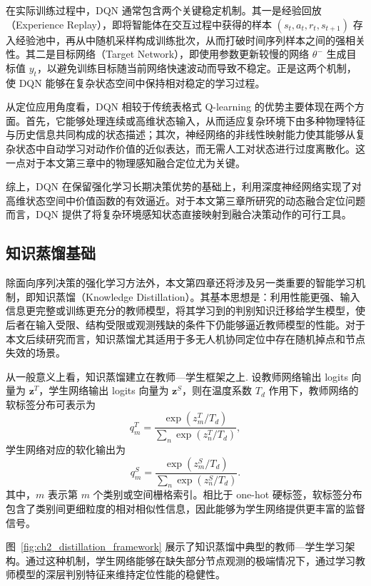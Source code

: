 在实际训练过程中，DQN 通常包含两个关键稳定机制。其一是经验回放（Experience Replay），即将智能体在交互过程中获得的样本 $(s_t,a_t,r_t,s_{t+1})$ 存入经验池中，再从中随机采样构成训练批次，从而打破时间序列样本之间的强相关性。其二是目标网络（Target Network），即使用参数更新较慢的网络 $\theta^-$ 生成目标值 $y_t$，以避免训练目标随当前网络快速波动而导致不稳定。正是这两个机制，使 DQN 能够在复杂状态空间中保持相对稳定的学习过程。

从定位应用角度看，DQN 相较于传统表格式 Q-learning 的优势主要体现在两个方面。首先，它能够处理连续或高维状态输入，从而适应复杂环境下由多种物理特征与历史信息共同构成的状态描述；其次，神经网络的非线性映射能力使其能够从复杂状态中自动学习对动作价值的近似表达，而无需人工对状态进行过度离散化。这一点对于本文第三章中的物理感知融合定位尤为关键。

综上，DQN 在保留强化学习长期决策优势的基础上，利用深度神经网络实现了对高维状态空间中价值函数的有效逼近。对于本文第三章所研究的动态融合定位问题而言，DQN 提供了将复杂环境感知状态直接映射到融合决策动作的可行工具。

\subsection{知识蒸馏基础}
\label{subsec:2_4_3}

除面向序列决策的强化学习方法外，本文第四章还将涉及另一类重要的智能学习机制，即知识蒸馏（Knowledge Distillation）。其基本思想是：利用性能更强、输入信息更完整或训练更充分的教师模型，将其学习到的判别知识迁移给学生模型，使后者在输入受限、结构受限或观测残缺的条件下仍能够逼近教师模型的性能。对于本文后续研究而言，知识蒸馏尤其适用于多无人机协同定位中存在随机掉点和节点失效的场景。

从一般意义上看，知识蒸馏建立在教师—学生框架之上. 设教师网络输出 logits 向量为 $\mathbf{z}^{T}$，学生网络输出 logits 向量为 $\mathbf{z}^{S}$，则在温度系数 $T_d$ 作用下，教师网络的软标签分布可表示为
\begin{equation}
q^{T}_{m}
=
\frac{\exp(z^{T}_{m}/T_d)}
{\sum_{n}\exp(z^{T}_{n}/T_d)},
\label{eq:2_32_teacher_soft}
\end{equation}
学生网络对应的软化输出为
\begin{equation}
q^{S}_{m}
=
\frac{\exp(z^{S}_{m}/T_d)}
{\sum_{n}\exp(z^{S}_{n}/T_d)}.
\label{eq:2_33_student_soft}
\end{equation}
其中，$m$ 表示第 $m$ 个类别或空间栅格索引。相比于 one-hot 硬标签，软标签分布包含了类别间更细粒度的相对相似性信息，因此能够为学生网络提供更丰富的监督信号。

图~\ref{fig:ch2_distillation_framework} 展示了知识蒸馏中典型的教师—学生学习架构。通过这种机制，学生网络能够在缺失部分节点观测的极端情况下，通过学习教师模型的深层判别特征来维持定位性能的稳健性。

